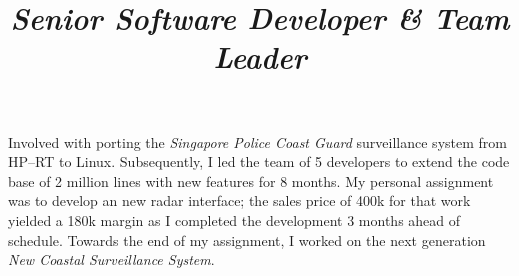\documentclass[overlapped,line,letterpaper]{res}
\begin{document}
\begin{resume}
  \newpage
  
  \title{\em Senior Software Developer \& Team Leader}
  \begin{position}
    Involved with porting the {\em Singapore Police Coast Guard} surveillance
    system from HP--RT to Linux. Subsequently, I led the team of 5 developers to
    extend the code base of 2 million lines with new features for 8 months. My
    personal assignment was to develop an new radar interface; the sales price
    of 400k for that work yielded a 180k margin as I completed the development 3
    months ahead of schedule. Towards the end of my assignment, I worked on the
    next generation {\em New Coastal Surveillance System}.
  \end{position}











\end{resume}
\end{document}
